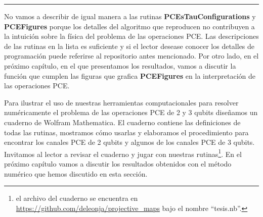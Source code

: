\noindent\rule{\textwidth}{1mm}
No vamos a describir de igual manera a las rutinas 
\textbf{PCEsTauConfigurations} y \textbf{PCEFigures} porque los 
detalles del algoritmo que reproducen no contribuyen a la intuición 
sobre la física del problema de las operaciones PCE. Las
descripciones de las rutinas en la lista es suficiente y si el lector desease 
conocer los detalles de programación puede referirse al 
repositorio antes mencionado. Por otro lado, en el próximo capítulo, 
en el que presentamos los resultados, vamos a discutir la función
que cumplen las figuras que grafica \textbf{PCEFigures} en la interpretación
de las operaciones PCE.

Para ilustrar el uso de nuestras herramientas computacionales para resolver
numéricamente el problema de las operaciones PCE de 2 y 3 qubits diseñamos 
un cuaderno de Wolfram Mathematica. El cuaderno contiene las 
definiciones de todas las rutinas, mostramos cómo usarlas 
y elaboramos el procedimiento para encontrar los canales PCE 
de 2 qubits y algunos de los canales PCE de 3 qubits. Invitamos al 
lector a revisar el cuaderno y jugar con nuestras rutinas\footnote{
el archivo del cuaderno se encuentra en
\href{https://github.com/deleonja/projective_maps}
{https://github.com/deleonja/projective\_maps} bajo el nombre 
``tesis.nb''. }. En el próximo capítulo vamos a discutir 
los resultados obtenidos con el método numérico que hemos 
discutido en esta sección.

\newpage


%


